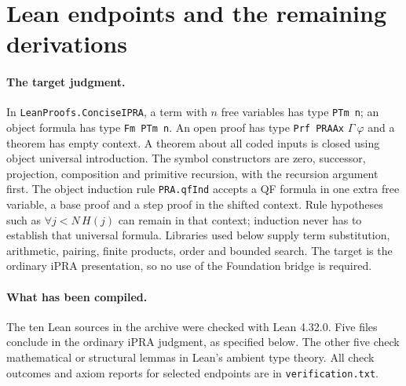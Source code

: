 \section{Lean endpoints and the remaining derivations}\label{sec:formal}

\paragraph{The target judgment.}
In \texttt{LeanProofs.ConciseIPRA}, a term with $n$ free variables has type \texttt{PTm n}; an object formula has type \texttt{Fm PTm n}. An open proof has type \texttt{Prf PRAAx} $\Gamma\ \varphi$ and a theorem has empty context. A theorem about all coded inputs is closed using object universal introduction. The symbol constructors are zero, successor, projection, composition and primitive recursion, with the recursion argument first. The object induction rule \texttt{PRA.qfInd} accepts a QF formula in one extra free variable, a base proof and a step proof in the shifted context. Rule hypotheses such as $\forall j<N\,H(j)$ can remain in that context; induction never has to establish that universal formula. Libraries used below supply term substitution, arithmetic, pairing, finite products, order and bounded search. The target is the ordinary iPRA presentation, so no use of the Foundation bridge is required.

\paragraph{What has been compiled.}
The ten Lean sources in the archive were checked with Lean 4.32.0. Five files conclude in the ordinary iPRA judgment, as specified below. The other five check mathematical or structural lemmas in Lean's ambient type theory. All check outcomes and axiom reports for selected endpoints are in \texttt{verification.txt}.


